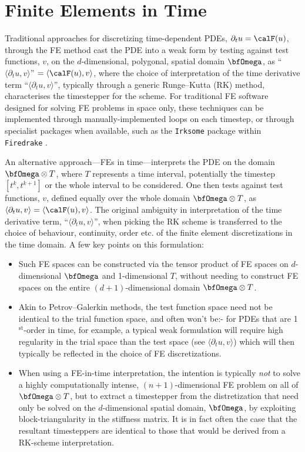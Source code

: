 \chapter{Finite Elements in Time}\label{cha:finite elements in time}

    Traditional approaches for discretizing time-dependent PDEs, $\partial_{t}u  =  \calF(u)$, through the FE method cast the PDE into a weak form by testing against test functions, $v$, on the $d$-dimensional, polygonal, spatial domain $\bfOmega$, as ``$\langle\partial_{t}u, v\rangle$''  $=  \langle\calF(u), v\rangle$, where the choice of interpretation of the time derivative term ``$\langle\partial_{t}u, v\rangle$'', typically through a generic Runge–Kutta (RK) method, characterises the timestepper for the scheme. For traditional FE software designed for solving FE problems in space only, these techniques can be implemented through manually-implemented loops on each timestep, or through specialist packages when available, such as the \texttt{Irksome} package within \texttt{Firedrake} \BA{[Ref]}.

    An alternative approach—FEs in time—interprets the PDE on the domain $\bfOmega\otimes T$, where $T$ represents a time interval, potentially the timestep $\left[t^{k}, t^{k + 1}\right]$ or the whole interval to be considered. One then tests against test functions, $v$, defined equally over the whole domain $\bfOmega\otimes T$, as $\langle\partial_{t}u, v\rangle  =  \langle\calF(u), v\rangle$. The original ambiguity in interpretation of the time derivative term, ``$\langle\partial_{t}u, v\rangle$'', when picking the RK scheme is transferred to the choice of behaviour, continuity, order etc. of the finite element discretizations in the time domain. A few key points on this formulation:
    \begin{itemize}
        \item  Such FE spaces can be constructed via the tensor product of FE spaces on $d$-dimensional $\bfOmega$ and 1-dimensional $T$, without needing to construct FE spaces on the entire $(d + 1)$-dimensional domain $\bfOmega\otimes T$.
        \item  Akin to Petrov–Galerkin methods, the test function space need not be identical to the trial function space, and often won't be:- for PDEs that are 1$^{\text{st}}$-order in time, for example, a typical weak formulation will require high regularity in the trial space than the test space (see $\langle\partial_{t}u, v\rangle$) which will then typically be reflected in the choice of FE discretizations.
        \item  When using a FE-in-time interpretation, the intention is typically \emph{not} to solve a highly computationally intense, $(n + 1)$-dimensional FE problem on all of $\bfOmega\otimes T$, but to extract a timestepper from the distretization that need only be solved on the $d$-dimensional spatial domain, $\bfOmega$, by exploiting block-triangularity in the stiffness  matrix. It is in fact often the case that the resultant timesteppers are identical to those that would be derived from a RK-scheme interpretation.
    \end{itemize}

